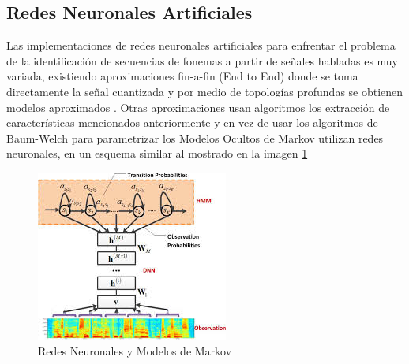 \subsection{Redes Neuronales Artificiales}

Las implementaciones de redes neuronales artificiales para enfrentar el problema de la identificación de secuencias de fonemas a partir de señales habladas es muy variada, existiendo aproximaciones fin-a-fin (End to End) donde se toma directamente la señal cuantizada y por medio de topologías profundas se obtienen modelos aproximados \cite{Hannun2014}. Otras aproximaciones usan algoritmos los extracción de características mencionados anteriormente y en vez de usar los algoritmos de Baum-Welch  para parametrizar los Modelos Ocultos de Markov utilizan redes neuronales, en un esquema similar al mostrado en la imagen \ref{img:cd-dnn-hmm}

\begin{figure}[H]

\centering
\caption{Redes Neuronales y Modelos de Markov \cite{Deng2012}}
\label{img:cd-dnn-hmm}
\includegraphics[]{imagenes/cd-dnn-hmm.jpeg}
\end{figure}


